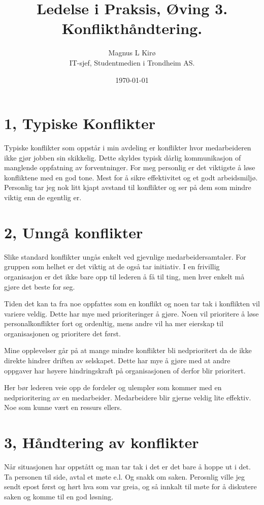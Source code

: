 \documentclass[12pt, a4paper]{article}
\title{
	Ledelse i Praksis, Øving 3. Konflikthåndtering. 
}
\author{
	Magnus L Kirø \\
	IT-sjef, Studentmedien i Trondheim AS. 
}
\date{\today}
\begin{document}
\maketitle
{}

\section{1, Typiske Konflikter}
 
Typiske konflikter som oppstår i min avdeling er konflikter hvor medarbeideren
ikke gjør jobben sin skikkelig. Dette skyldes typisk dårlig kommunikasjon of
manglende oppfatning av forventninger. For meg personlig er det viktigste å
løse konfliktene med en god tone. Mest for å sikre effektivitet og et godt
arbeidsmiljø. Personlig tar jeg nok litt kjapt avstand til konflikter og ser på
dem som mindre viktig enn de egentlig er. 

\section{2, Unngå konflikter}
Slike standard konflikter ungås enkelt ved gjevnlige medarbeidersamtaler. 
For gruppen som helhet er det viktig at de også tar initiativ. I en frivillig
organisasjon er det ikke bare opp til lederen å få til ting, men hver enkelt må
gjøre det beste for seg. 

Tiden det kan ta fra noe oppfattes som en konflikt og noen tar tak i konflikten
vil variere veldig. Dette har mye med prioriteringer å gjøre. Noen vil
prioritere å løse personalkonflikter fort og ordenltig, mens andre vil ha mer
eierskap til organisasjonen og prioritere det først. 

Mine opplevelser går på at mange mindre konflikter bli nedprioritert da de ikke
direkte hindrer driften av selskapet. Dette har mye å gjøre med at andre
oppgaver har høyere hindringskraft på organisasjonen of derfor blir prioritert.

Her bør lederen veie opp de fordeler og ulempler som kommer med en
nedprioritering av en medarbeider. Medarbeidere blir gjerne veldig lite
effektiv. Noe som kunne vært en ressurs ellers.

\section{3, Håndtering av konflikter}
Når situasjonen har oppstått og man tar tak i det er det bare å hoppe ut i det.
Ta personen til side, avtal et møte e.l. Og snakk om saken. Perosnlig ville jeg
sendt epost først og hørt hva som var greia, og så innkalt til møte for å
diskutere saken og komme til en god løsning. 
\end{document}
